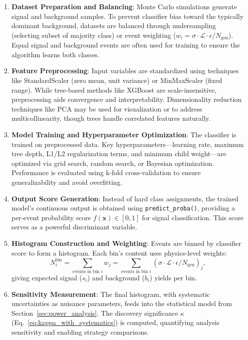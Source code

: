 \begin{enumerate}
    \item \textbf{Dataset Preparation and Balancing}: Monte Carlo simulations generate signal and background samples. To prevent classifier bias toward the typically dominant background, datasets are balanced through undersampling (selecting subset of majority class) or event weighting ($w_i = \sigma \cdot \mathcal{L} \cdot \epsilon / N_{\text{gen}}$). Equal signal and background events are often used for training to ensure the algorithm learns both classes.
    
    \item \textbf{Feature Preprocessing}: Input variables are standardized using techniques like StandardScaler (zero mean, unit variance) or MinMaxScaler (fixed range). While tree-based methods like XGBoost are scale-insensitive, preprocessing aids convergence and interpretability. Dimensionality reduction techniques like PCA may be used for visualization or to address multicollinearity, though trees handle correlated features naturally.
    
    \item \textbf{Model Training and Hyperparameter Optimization}: The classifier is trained on preprocessed data. Key hyperparameters—learning rate, maximum tree depth, L1/L2 regularization terms, and minimum child weight—are optimized via grid search, random search, or Bayesian optimization. Performance is evaluated using k-fold cross-validation to ensure generalizability and avoid overfitting.
    
    \item \textbf{Output Score Generation}: Instead of hard class assignments, the trained model's continuous output is obtained using \texttt{predict\_proba()}, providing a per-event probability score $f(\mathbf{x}) \in [0, 1]$ for signal classification. This score serves as a powerful discriminant variable.
    
    \item \textbf{Histogram Construction and Weighting}: Events are binned by classifier score to form a histogram. Each bin's content uses physics-level weights:
    \[
    N_i^{\text{bin}} = \sum_{\text{events in bin } i} w_j = \sum_{\text{events in bin } i} \left( \sigma \cdot \mathcal{L} \cdot \epsilon / N_{\text{gen}} \right)_j,
    \]
    giving expected signal ($s_i$) and background ($b_i$) yields per bin.
    
    \item \textbf{Sensitivity Measurement}: The final histogram, with systematic uncertainties as nuisance parameters, feeds into the statistical model from Section~\ref{sec:power_analysis}. The discovery significance $\kappa$ (Eq.~\ref{eq:kappa_with_systematics}) is computed, quantifying analysis sensitivity and enabling strategy comparisons.
\end{enumerate}

